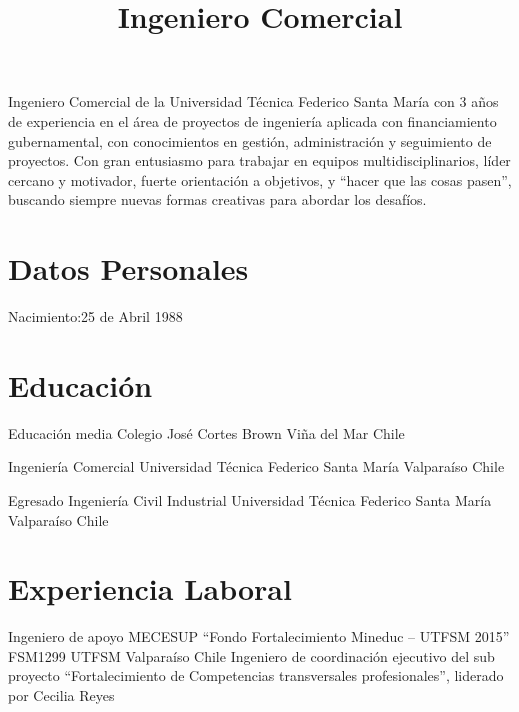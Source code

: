 \documentclass[letter,10pt]{moderncv}
\title{Ingeniero Comercial}               %
\begin{document}
\maketitle
\vspace{-30pt}
\begin{center}
Ingeniero Comercial de la Universidad Técnica Federico Santa María con 3 años de experiencia en el área de
proyectos de ingeniería aplicada con financiamiento gubernamental, con conocimientos en gestión,
administración y seguimiento de proyectos. Con gran entusiasmo para trabajar en equipos multidisciplinarios,
líder cercano y motivador, fuerte orientación a objetivos, y “hacer que las cosas pasen”, buscando siempre
nuevas formas creativas para abordar los desafíos.
 \end{center}
\section{Datos Personales}
           {Nacimiento:}{25 de Abril 1988}
           {}{}

\section{Educación}

        {Educación media}
        {Colegio José Cortes Brown}
        {Viña del Mar}
        {Chile}
        {}

        {Ingeniería Comercial}
        {Universidad Técnica Federico Santa María}
        {Valparaíso}
        {Chile}
        {}

        {Egresado Ingeniería Civil Industrial}
        {Universidad Técnica Federico Santa María}
        {Valparaíso}
        {Chile}
        {}


\section{Experiencia Laboral}

        {Ingeniero de apoyo MECESUP “Fondo Fortalecimiento Mineduc – UTFSM 2015” FSM1299}
        {UTFSM}
        {Valparaíso}
        {Chile}
        {Ingeniero de coordinación ejecutivo del sub proyecto “Fortalecimiento de Competencias transversales profesionales”, liderado por Cecilia Reyes}
\end{document}
